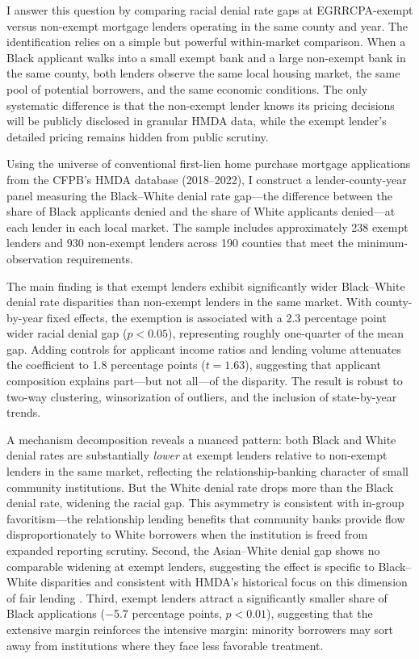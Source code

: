 \documentclass[12pt]{article}
\begin{document}
I answer this question by comparing racial denial rate gaps at EGRRCPA-exempt versus non-exempt mortgage lenders operating in the same county and year. The identification relies on a simple but powerful within-market comparison. When a Black applicant walks into a small exempt bank and a large non-exempt bank in the same county, both lenders observe the same local housing market, the same pool of potential borrowers, and the same economic conditions. The only systematic difference is that the non-exempt lender knows its pricing decisions will be publicly disclosed in granular HMDA data, while the exempt lender's detailed pricing remains hidden from public scrutiny.

Using the universe of conventional first-lien home purchase mortgage applications from the CFPB's HMDA database (2018--2022), I construct a lender-county-year panel measuring the Black--White denial rate gap---the difference between the share of Black applicants denied and the share of White applicants denied---at each lender in each local market. The sample includes approximately 238 exempt lenders and 930 non-exempt lenders across 190 counties that meet the minimum-observation requirements.

The main finding is that exempt lenders exhibit significantly wider Black--White denial rate disparities than non-exempt lenders in the same market. With county-by-year fixed effects, the exemption is associated with a 2.3 percentage point wider racial denial gap ($p < 0.05$), representing roughly one-quarter of the mean gap. Adding controls for applicant income ratios and lending volume attenuates the coefficient to 1.8 percentage points ($t = 1.63$), suggesting that applicant composition explains part---but not all---of the disparity. The result is robust to two-way clustering, winsorization of outliers, and the inclusion of state-by-year trends.

A mechanism decomposition reveals a nuanced pattern: both Black and White denial rates are substantially \textit{lower} at exempt lenders relative to non-exempt lenders in the same market, reflecting the relationship-banking character of small community institutions. But the White denial rate drops more than the Black denial rate, widening the racial gap. This asymmetry is consistent with in-group favoritism---the relationship lending benefits that community banks provide flow disproportionately to White borrowers when the institution is freed from expanded reporting scrutiny. Second, the Asian--White denial gap shows no comparable widening at exempt lenders, suggesting the effect is specific to Black--White disparities and consistent with HMDA's historical focus on this dimension of fair lending \citep{bhutta2015effects}. Third, exempt lenders attract a significantly smaller share of Black applications ($-$5.7 percentage points, $p < 0.01$), suggesting that the extensive margin reinforces the intensive margin: minority borrowers may sort away from institutions where they face less favorable treatment.
\end{document}
